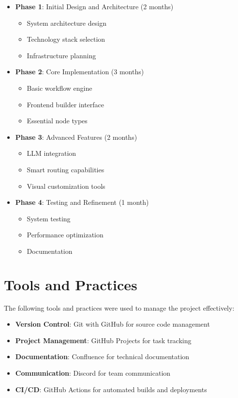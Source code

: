 \begin{itemize}
    \item \textbf{Phase 1}: Initial Design and Architecture (2 months)
    \begin{itemize}
        \item System architecture design
        \item Technology stack selection
        \item Infrastructure planning
    \end{itemize}
    
    \item \textbf{Phase 2}: Core Implementation (3 months)
    \begin{itemize}
        \item Basic workflow engine
        \item Frontend builder interface
        \item Essential node types
    \end{itemize}
    
    \item \textbf{Phase 3}: Advanced Features (2 months)
    \begin{itemize}
        \item LLM integration
        \item Smart routing capabilities
        \item Visual customization tools
    \end{itemize}
    
    \item \textbf{Phase 4}: Testing and Refinement (1 month)
    \begin{itemize}
        \item System testing
        \item Performance optimization
        \item Documentation
    \end{itemize}
\end{itemize}

\section{Tools and Practices}
The following tools and practices were used to manage the project effectively:

\begin{itemize}
    \item \textbf{Version Control}: Git with GitHub for source code management
    \item \textbf{Project Management}: GitHub Projects for task tracking
    \item \textbf{Documentation}: Confluence for technical documentation
    \item \textbf{Communication}: Discord for team communication
    \item \textbf{CI/CD}: GitHub Actions for automated builds and deployments
\end{itemize}

